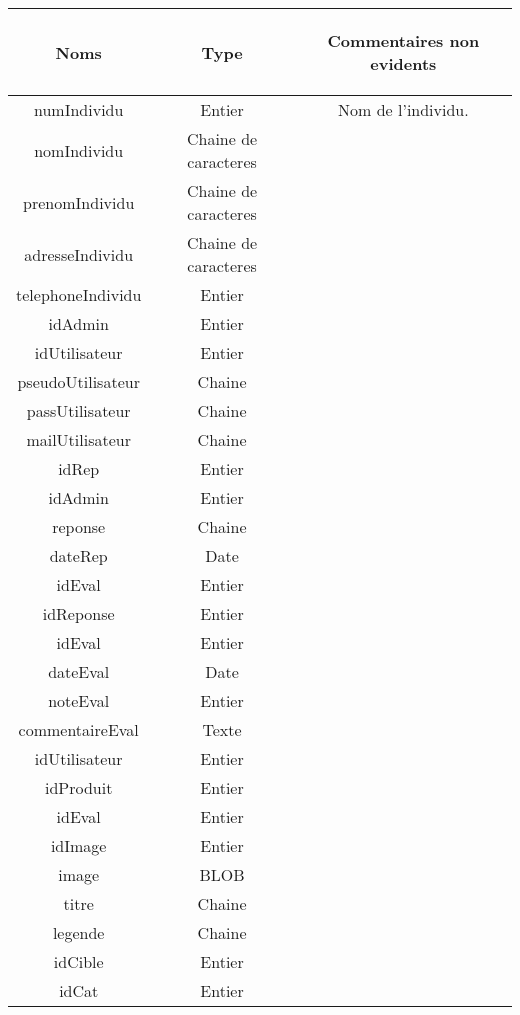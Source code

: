 \documentclass{report}
\begin{document}
\begin{tabular}{|c|c|c|}

\hline
\begin{bf}Noms\end{bf} & \begin{bf} Type \end{bf} & \begin{bf} Commentaires non evidents\end{bf}\\
\hline
numIndividu & Entier & Nom de l'individu.\\
\hline
nomIndividu & Chaine de caracteres & \\
\hline
prenomIndividu & Chaine de caracteres & \\
\hline
adresseIndividu & Chaine de caracteres & \\
\hline
telephoneIndividu & Entier & \\
\hline
idAdmin & Entier & \\
\hline
idUtilisateur & Entier & \\
\hline
pseudoUtilisateur & Chaine & \\
\hline
passUtilisateur & Chaine & \\
\hline
mailUtilisateur & Chaine & \\
\hline
idRep & Entier & \\
\hline
idAdmin & Entier & \\
\hline
reponse & Chaine & \\
\hline
dateRep & Date & \\
\hline
idEval & Entier & \\
\hline
idReponse & Entier & \\
\hline
idEval & Entier & \\
\hline
dateEval & Date & \\
\hline
noteEval & Entier & \\
\hline
commentaireEval & Texte & \\
\hline
idUtilisateur & Entier & \\
\hline
idProduit & Entier & \\
\hline
idEval & Entier & \\
\hline
idImage & Entier & \\
\hline
image & BLOB & \\
\hline
titre & Chaine & \\
\hline
legende & Chaine & \\
\hline
idCible & Entier & \\
\hline
idCat & Entier & \\

\end{tabular}
\end{document}

